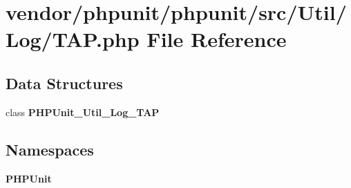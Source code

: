 \section{vendor/phpunit/phpunit/src/\+Util/\+Log/\+T\+A\+P.php File Reference}
\label{_t_a_p_8php}
\subsection*{Data Structures}
\begin{DoxyCompactItemize}
\item 
class {\bf P\+H\+P\+Unit\+\_\+\+Util\+\_\+\+Log\+\_\+\+T\+A\+P}
\end{DoxyCompactItemize}
\subsection*{Namespaces}
\begin{DoxyCompactItemize}
\item 
 {\bf P\+H\+P\+Unit}
\end{DoxyCompactItemize}
